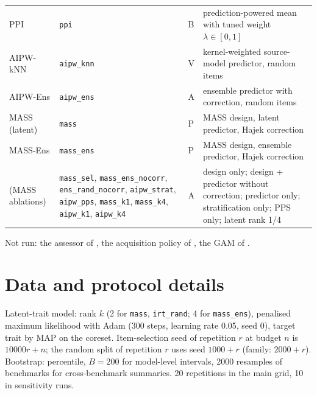 \begin{center}
\begin{tabular}{@{}l>{\raggedright\arraybackslash}p{4.4cm}l p{5.3cm}@{}}
PPI & \texttt{ppi} & B & prediction-powered mean with tuned weight $\lambda\in[0,1]$ \\
AIPW-kNN & \texttt{aipw\_knn} & V & kernel-weighted source-model predictor, random items \\
AIPW-Ens & \texttt{aipw\_ens} & A & ensemble predictor with correction, random items \\
MASS (latent) & \texttt{mass} & P & MASS design, latent predictor, Hajek correction \\
MASS-Ens & \texttt{mass\_ens} & P & MASS design, ensemble predictor, Hajek correction \\
(MASS ablations) & \texttt{mass\_sel}, \texttt{mass\_ens\_nocorr}, \texttt{ens\_rand\_nocorr}, \texttt{aipw\_strat}, \texttt{aipw\_pps}, \texttt{mass\_k1}, \texttt{mass\_k4}, \texttt{aipw\_k1}, \texttt{aipw\_k4} & A & design only; design + predictor without correction; predictor only; stratification only; PPS only; latent rank 1/4 \\
\bottomrule
\end{tabular}
\end{center}
Not run: the assessor of \citet{pacchiardi2024100}, the acquisition policy of \citet{li2025active}, the GAM of \citet{kipnis2025metabench}.

\FloatBarrier
\section{Data and protocol details}\label{app:data}
\begin{table}[h]
\caption{Score matrices after loading (raw models, models after removing exact duplicate rows, items, accuracy range across models, items solved by all or by no model). * = development benchmark. Models with near-zero accuracy are dropped from MATH Lvl~5 (394 raw rows remain).}
\centering\scriptsize

\end{table}
Latent-trait model: rank $k$ (2 for \texttt{mass}, \texttt{irt\_rand}; 4 for \texttt{mass\_ens}), penalised maximum likelihood with Adam (300 steps, learning rate 0.05, seed 0), target trait by MAP on the coreset. Item-selection seed of repetition $r$ at budget $n$ is $10000r+n$; the random split of repetition $r$ uses seed $1000+r$ (family: $2000+r$). Bootstrap: percentile, $B=200$ for model-level intervals, 2000 resamples of benchmarks for cross-benchmark summaries. 20 repetitions in the main grid, 10 in sensitivity runs.

\FloatBarrier

